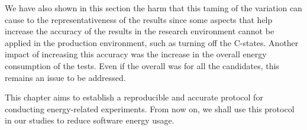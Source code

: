 We have also shown in this section the harm that this taming of the variation can cause to the representativeness of the results since some aspects that help increase the accuracy of the results in the research environment cannot be applied in the production environment, such as turning off the C-states. Another impact of increasing this accuracy was the increase in the overall energy consumption of the tests. Even if the overall was for all the candidates, this remains an issue to be addressed.

This chapter aims to establish a reproducible and accurate protocol for conducting energy-related experiments. From now on, we shall use this protocol in our studies to reduce software energy usage.







